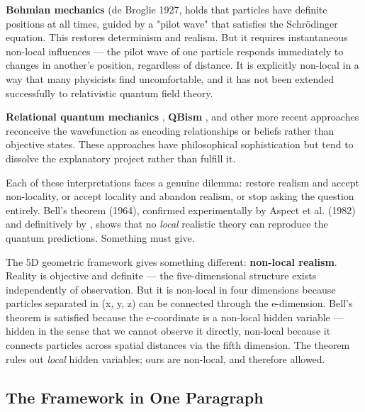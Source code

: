\documentclass[aps,prd,preprint,superscriptaddress,longbibliography,floatfix]{revtex4-2}
\theoremstyle{remark}
\begin{document}
\textbf{Bohmian mechanics} (de Broglie 1927, \cite{Bohm1952} holds that particles have definite positions at all times, guided by a "pilot wave" that satisfies the Schr\"{o}dinger equation. This restores determinism and realism. But it requires instantaneous non-local influences --- the pilot wave of one particle responds immediately to changes in another's position, regardless of distance. It is explicitly non-local in a way that many physicists find uncomfortable, and it has not been extended successfully to relativistic quantum field theory.

\textbf{Relational quantum mechanics} \cite{Rovelli1996}, \textbf{QBism} \cite{Fuchs2010}, and other more recent approaches reconceive the wavefunction as encoding relationships or beliefs rather than objective states. These approaches have philosophical sophistication but tend to dissolve the explanatory project rather than fulfill it.

Each of these interpretations faces a genuine dilemma: restore realism and accept non-locality, or accept locality and abandon realism, or stop asking the question entirely. Bell's theorem (1964), confirmed experimentally by Aspect et al. (1982) and definitively by \cite{Hensenetal2015}, shows that no \textit{local} realistic theory can reproduce the quantum predictions. Something must give.

The 5D geometric framework gives something different: \textbf{non-local realism}. Reality is objective and definite --- the five-dimensional structure exists independently of observation. But it is non-local in four dimensions because particles separated in (x, y, z) can be connected through the e-dimension. Bell's theorem is satisfied because the e-coordinate is a non-local hidden variable --- hidden in the sense that we cannot observe it directly, non-local because it connects particles across spatial distances via the fifth dimension. The theorem rules out \textit{local} hidden variables; ours are non-local, and therefore allowed.



\subsection{The Framework in One Paragraph}
\end{document}
